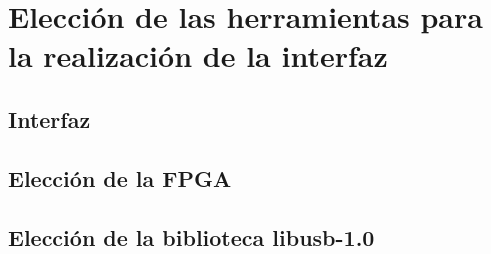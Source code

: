 \chapter{Elección de las herramientas para la realización de la interfaz}
	\label{cap:mats}
	
	\section{Interfaz}
			
	\section{Elección de la FPGA}
		
	\section{Elección de la biblioteca libusb-1.0}
		
	
%		
%		
%		
		